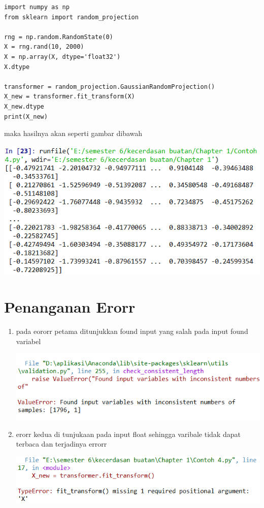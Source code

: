\documentclass{homework}
\begin{document}
\begin{verbatim}
import numpy as np
from sklearn import random_projection

rng = np.random.RandomState(0)
X = rng.rand(10, 2000)
X = np.array(X, dtype='float32')
X.dtype

transformer = random_projection.GaussianRandomProjection()
X_new = transformer.fit_transform(X)
X_new.dtype
print(X_new)
\end{verbatim}
maka hasilnya akan seperti gambar dibawah
\begin{center}
    \includegraphics[width=.8\textwidth]{Figure/hasil4.PNG}
\end{center}

\section{Penanganan Erorr}

\begin{enumerate}
    \item pada eororr petama ditunjukkan found input yang salah pada input found variabel
\begin{center}
    \includegraphics[width=.8\textwidth]{Figure/erorr1.PNG}
\end{center}    
    \item erorr kedua di tunjukaan pada input float sehingga varibale tidak dapat terbaca dan terjadinya errorr
\begin{center}
    \includegraphics[width=.8\textwidth]{Figure/erorr2.PNG}
\end{center} 
\end{enumerate}
\end{document}
